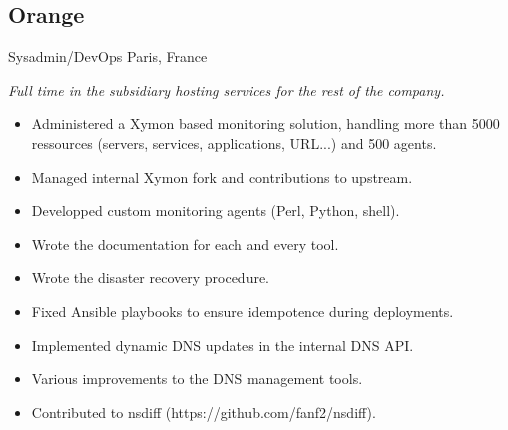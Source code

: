 \documentclass[]{friggeri-cv} %
\begin{document}
\subsection{Orange}
\begin{entrylist}
 {Sysadmin/DevOps} {Paris, France} {
  \emph{Full time in the subsidiary hosting services for the rest of the company.}
  \begin{itemize}
    \item Administered a Xymon based monitoring solution, handling more than 5000 ressources (servers, services, applications, URL...) and 500 agents.
    \item Managed internal Xymon fork and contributions to upstream.
    \item Developped custom monitoring agents (Perl, Python, shell).
    \item Wrote the documentation for each and every tool.
    \item Wrote the disaster recovery procedure.
    \item Fixed Ansible playbooks to ensure idempotence during deployments.
    \item Implemented dynamic DNS updates in the internal DNS API.
    \item Various improvements to the DNS management tools.
    \item Contributed to nsdiff (https://github.com/fanf2/nsdiff).
  \end{itemize}
}
\end{entrylist}




\pagebreak
\end{document}
